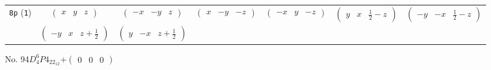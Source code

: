 \documentclass[fleqn,9pt,landscape]{jsarticle}
\begin{document}
\begin{center}
\begin{longtable}{ccccccc}
{\tt 8p} ({\tt 1}) & $ \begin{pmatrix} x & y & z \end{pmatrix} $ & $ \begin{pmatrix} - x & - y & z \end{pmatrix} $ & $ \begin{pmatrix} x & - y & - z \end{pmatrix} $ & $ \begin{pmatrix} - x & y & - z \end{pmatrix} $ & $ \begin{pmatrix} y & x & \frac{1}{2} - z \end{pmatrix} $ & $ \begin{pmatrix} - y & - x & \frac{1}{2} - z \end{pmatrix} $ \\
& $ \begin{pmatrix} - y & x & z + \frac{1}{2} \end{pmatrix} $ & $ \begin{pmatrix} y & - x & z + \frac{1}{2} \end{pmatrix} $ & $  $ & $  $ & $  $ & $  $ \\
\end{longtable}
\end{center}
\newpage
No. 94\quad$D_{4}^{6}$\quad$P4_22_12$\quad[ tetragonal ]\quad$+\begin{pmatrix} 0 & 0 & 0 \end{pmatrix}$
\end{document}
